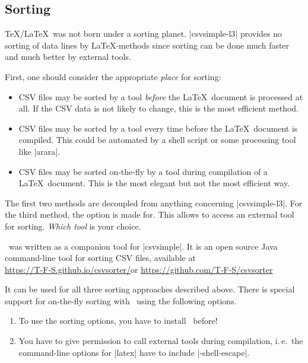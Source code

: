 \documentclass[a4paper,11pt]{ltxdoc}
\begin{document}
\clearpage
\subsection{Sorting}\label{sec:Sorting}%
\TeX/\LaTeX\ was not born under a sorting planet. |csvsimple-l3| provides no
sorting of data lines by \LaTeX-methods since sorting can be done much faster
and much better by external tools.

First, one should consider the appropriate \emph{place} for sorting:
\begin{itemize}
\item CSV files may be sorted by a tool \emph{before} the \LaTeX\ document is processed
  at all. If the CSV data is not likely to change, this is the most efficient method.
\item CSV files may be sorted by a tool every time before the \LaTeX\ document is compiled.
  This could be automated by a shell script or some processing tool like |arara|.
\item CSV files may be sorted on-the-fly by a tool during compilation of
  a \LaTeX\ document. This is the most elegant but not the most efficient way.
\end{itemize}

The first two methods are decoupled from anything concerning |csvsimple-l3|.
For the third method, the  option is made for.
This allows to access an external tool for sorting.
\emph{Which tool} is your choice.

\csvsorter\ was written as a companion tool for |csvsimple|.
It is an open source Java command-line tool for sorting CSV files, available at\\
\url{https://T-F-S.github.io/csvsorter/}\quad or\quad
\url{https://github.com/T-F-S/csvsorter}

It can be
used for all three sorting approaches described above.
There is special support for on-the-fly sorting with \csvsorter\ using the
following options.

\begin{enumerate}\bfseries
\item To use the sorting options, you have to install \csvsorter\ before!
\item You have to give permission to call external tools during
  compilation, i.\,e.\ the command-line options for |latex| have to include
  |-shell-escape|.
\end{enumerate}

\bigskip
\end{document}
